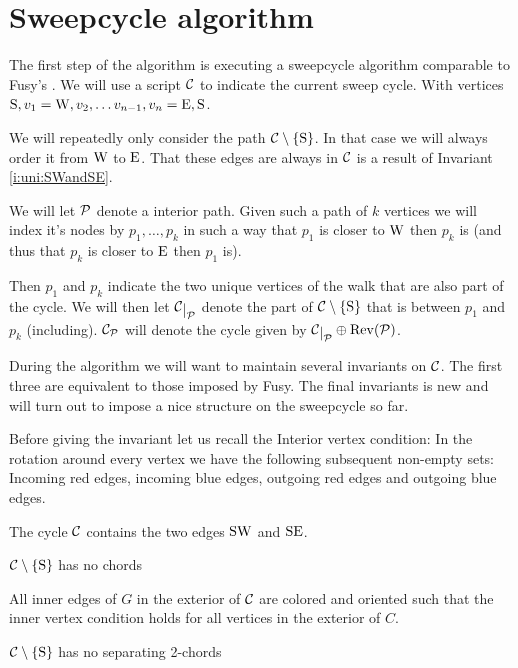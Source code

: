 
\section{Sweepcycle algorithm}
  \label{s:sweep}
  The first step of the algorithm is executing a sweepcycle algorithm comparable to Fusy's \cite{Fusy2006}. We will use a script $\C$ to indicate the current sweep cycle. With vertices $\pS, v_1 = \pW, v_2, \ldots v_{n-1}, v_n = \pE, \pS$.

  We will repeatedly only consider the path $\cpath$. In that case we will always order it from $\pW$ to $\pE$. That these edges are always in $\C$ is a result of Invariant \ref{i:uni:SWandSE}.

  We will let $\P$ denote a interior path. Given such a path of $k$ vertices we will index it's nodes by $p_1, \ldots, p_k$ in such a way that $p_1$ is closer to $\pW$ then $p_k$ is (and thus that $p_k$ is closer to $\pE$ then $p_1$ is).

  Then $p_1$ and $p_k$ indicate the two unique vertices of the walk that are also part of the cycle. We will then let $\restC{\P}$ denote the part of $\cpath$ that is between $p_1$ and $p_k$ (including). $\C_\P$ will denote the cycle given by $\restC{\P} \oplus \rev(\P)$.

  During the algorithm we will want to maintain several invariants on $\C$. The first three are equivalent to those imposed by Fusy. The final invariants is new and will turn out to impose a nice structure on the sweepcycle so far.

  Before giving the invariant let us recall the Interior vertex condition: In the rotation around every vertex we have the following subsequent non-empty sets: Incoming red edges, incoming blue edges, outgoing red edges and outgoing blue edges.

  \begin{invariants}
    \itemsep=-4pt

    \item \label{i:uni:SWandSE} The cycle $\C$ contains the two edges $\pS \pW$ and $\pS \pE$.
    \item \label{i:uni:noChords} $\cpath$ has no chords
    \item \label{i:uni:intVertCond} All inner edges of $G$ in the exterior of $\C$ are colored and oriented such that the inner vertex condition holds for all vertices in the exterior of $C$.
    \item \label{i:uni:no2Chords} $\C\sm{\pS}$ has no separating 2-chords
  \end{invariants}

